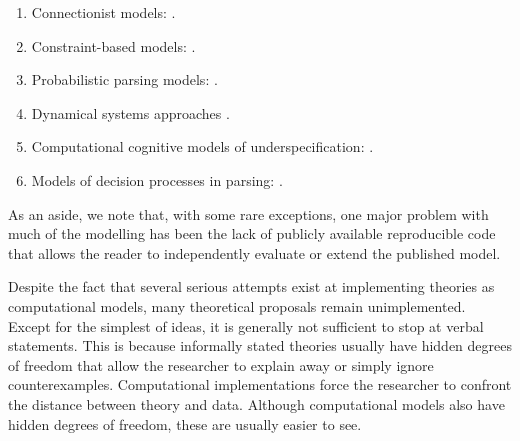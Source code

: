 \documentclass{cambridge7A}\usepackage[]{graphicx}\usepackage[]{color}
\begin{document}
\begin{enumerate}
\item  {}
Connectionist models: \cite{MacDonaldChristiansen2002,Frank2009,EngelmannVasishth2009,rabovsky2014simulating,linzen2018distinct}. 
\item  {}
Constraint-based models: \cite{McRaeSpiveyKnowltonTanenhaus1998}. 
\item Probabilistic parsing models: \cite{Hale2001,Levy2008,rasmussen2017left}. 
\item  {}
Dynamical systems approaches \cite{vossekempen2000,taboretal04,cho2017incremental,SmithFranckTaborCogSci2018}. 
\item  {}
Computational cognitive models of underspecification: \cite{LogacevVasishthQJEP2016}. 
\item  {}
Models of decision processes in parsing: \cite{hammerly2019grammaticality,parker2019cue}.
\end{enumerate}

As an aside, we note that, with some rare exceptions, one major
problem with much of the modelling has been the lack of publicly
available reproducible code that allows the reader to independently
evaluate or extend the published model. 

Despite the fact that several serious attempts exist at implementing theories as computational models, many theoretical proposals remain unimplemented.
Except for the simplest of ideas, it is generally not sufficient to stop
at verbal statements. This is because informally stated theories
usually have hidden degrees of freedom that allow the researcher to
explain away or simply ignore counterexamples.  Computational
implementations force the researcher to confront the distance between
theory and data. Although computational models also have hidden
degrees of freedom, these are usually easier to see.
\end{document}
